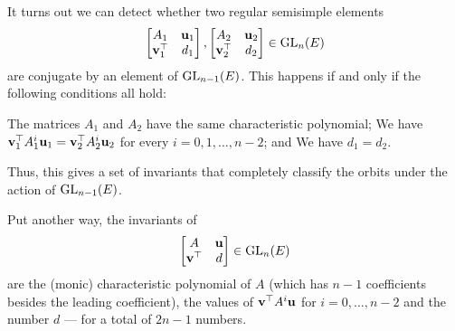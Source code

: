 \begin{remark}
  It turns out we can detect whether two regular semisimple elements
  \[
    \begin{bmatrix} A_1 & \mathbf u_1 \\ \mathbf v_1^\top & d_1 \end{bmatrix},
    \begin{bmatrix} A_2 & \mathbf u_2 \\ \mathbf v_2^\top & d_2 \end{bmatrix}
    \in \operatorname{GL}_{n}(E)
  \]
  are conjugate by an element of $\operatorname{GL}_{n-1}(E)$.
  This happens if and only if the following conditions all hold:
  \begin{itemize}
    \ii The matrices $A_1$ and $A_2$ have the same characteristic polynomial;
    \ii We have $\mathbf v_1^\top A_1^i \mathbf u_1 = \mathbf v_2^\top A_2^i \mathbf u_2$
    for every $i = 0, 1, \dots, n-2$; and
    \ii We have $d_1 = d_2$.
  \end{itemize}
  Thus, this gives a set of invariants that completely classify the orbits
  under the action of $\operatorname{GL}_{n-1}(E)$.

  Put another way, the invariants of
  \[ \begin{bmatrix} A & \mathbf u \\ \mathbf v^\top & d \end{bmatrix} \in \operatorname{GL}_n(E) \]
  are the (monic) characteristic polynomial of $A$
  (which has $n-1$ coefficients besides the leading coefficient),
  the values of $\mathbf v^\top A^i \mathbf u$ for $i = 0, \dots, n-2$
  and the number $d$ --- for a total of $2n-1$ numbers.
  \label{rem:invariants}
\end{remark}

